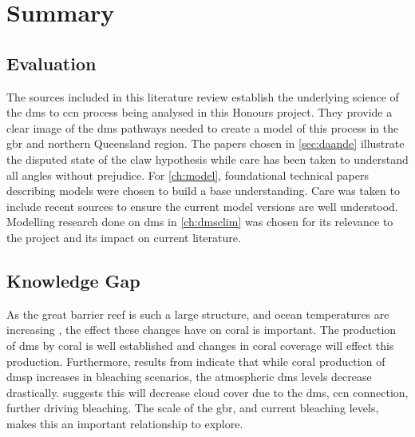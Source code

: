 \chapter{Summary}
\label{ch:summ}


\section{Evaluation}
\label{sec:eval}

	The sources included in this literature review establish the underlying science of the \gls{dms} to \gls{ccn} process being analysed in this Honours project. They provide a clear image of the \gls{dms} pathways needed to create a model of this process in the \gls{gbr} and northern Queensland region. The papers chosen in \cref{sec:daande} illustrate the disputed state of the \gls{claw} hypothesis while care has been taken to understand all angles without prejudice. For \cref{ch:model}, foundational technical papers describing models were chosen to build a base understanding. Care was taken to include recent sources to ensure the current model versions are well understood. Modelling research done on \gls{dms} in \cref{ch:dmsclim} was chosen for its relevance to the project and its impact on current literature.


\section{Knowledge Gap}
\label{sec:knowgap}

	As the great barrier reef is such a large structure, and ocean temperatures are increasing \citep{hoeghguldberg:1999bi}, the effect these changes have on coral is important. The production of \gls{dms} by coral is well established \citep{jones:2005ez,fischer2012atmospheric} and changes in coral coverage will effect this production. Furthermore, results from \citet{fischer2012atmospheric} indicate that while coral production of \gls{dmsp} increases in bleaching scenarios, the atmospheric \gls{dms} levels decrease drastically. \citet{fischer2012atmospheric} suggests this will decrease cloud cover due to the \gls{dms}, \gls{ccn} connection, further driving bleaching. The scale of the \gls{gbr}, and current bleaching levels, makes this an important relationship to explore.

